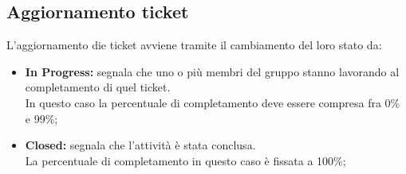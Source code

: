   \subsection{Aggiornamento ticket}
    L'aggiornamento die ticket avviene tramite il cambiamento del loro stato da:
    \begin{itemize}
      \item \textbf{In Progress: }segnala che uno o più membri del gruppo stanno lavorando al completamento di quel ticket.\\
      In questo caso la percentuale di completamento deve essere compresa fra 0\% e 99\%;
      \item \textbf{Closed: }segnala che l'attività è stata conclusa.\\
      La percentuale di completamento in questo caso è fissata a 100\%;
    \end{itemize}
